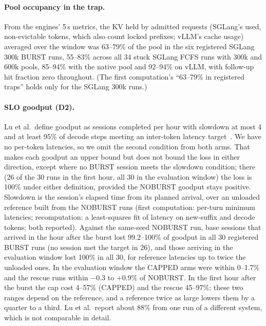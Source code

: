 \paragraph{Pool occupancy in the trap.} From the engines' 5\,s metrics, the KV held by admitted requests (SGLang's used, non-evictable
tokens, which also count locked prefixes; vLLM's cache usage) averaged over the window was 63--79\% of the pool in the six registered
SGLang 300k BURST runs, 55--83\% across all 34 stuck SGLang FCFS runs with 300k and 600k pools, 85--94\% with the native pool and 92--94\%
on vLLM, with follow-up hit fraction zero throughout. (The first computation's ``63--79\% in registered traps'' holds only for the
SGLang 300k runs.)

\paragraph{SLO goodput (D2).} Lu et al.\ define goodput as sessions completed per hour with slowdown at most 4 and at least 95\% of
decode steps meeting an inter-token latency target~\citep{lu2026cachetrap}. We have no per-token latencies, so we omit the second
condition from both arms. That makes each goodput an upper bound but does not bound the loss in either direction, except where no
BURST session meets the slowdown condition; there (26 of the 30 runs in the first hour, all 30 in the evaluation window) the loss is
100\% under either definition, provided the NOBURST goodput stays positive. Slowdown is the session's elapsed time from its planned
arrival, over an unloaded reference built from the NOBURST runs (first computation: per-turn minimum latencies; recomputation: a
least-squares fit of latency on new-suffix and decode tokens; both reported). Against the same-seed NOBURST run, base sessions that
arrived in the hour after the burst lost 99.2--100\% of goodput in all 30 registered BURST runs (no session met the target in 26), and
those arriving in the evaluation window lost 100\% in all 30, for reference latencies up to twice the unloaded ones. In the evaluation
window the CAPPED arms were within 0--1.7\% and the rescue runs within $-0.3$ to $+0.9$\% of NOBURST. In the first hour after the
burst the cap cost 4--57\% (CAPPED) and the rescue 45--97\%; these two ranges depend on the reference, and a reference twice as large
lowers them by a quarter to a third. Lu et al.\ report about 88\% from one run of a different system, which is not comparable in
detail.
